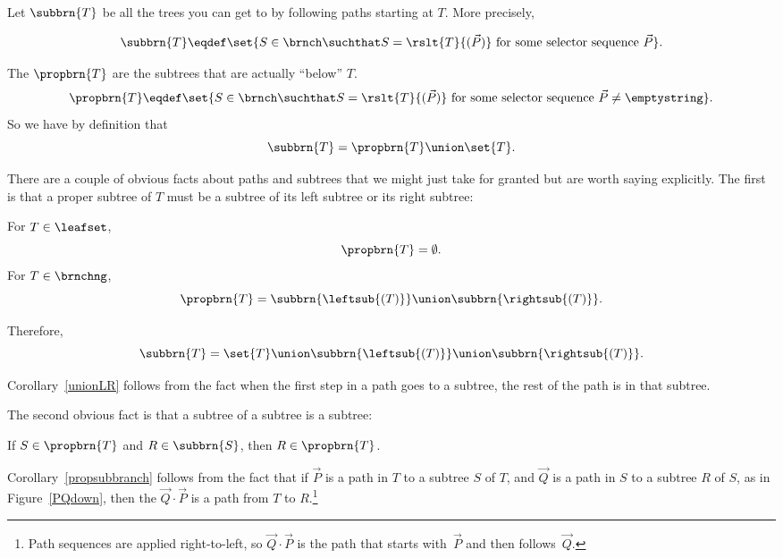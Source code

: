 \begin{definition}
\begin{definition}
\end{definition}
\medskip

Let $\subbrn{T}$ be all the trees you can get to by following paths
starting at $T$.  More precisely,
\begin{definition}\label{def:subtree}
\[
\subbrn{T} \eqdef \set{S \in \brnch \suchthat S =
  \rslt{T}{(\vec{P})}\ \text{for some selector sequence}\ \vec{P}}.
\]
\end{definition}

The  $\propbrn{T}$ are the subtrees that are
actually ``below'' $T$.
\[
\propbrn{T} \eqdef \set{S \in \brnch \suchthat S =
  \rslt{T}{(\vec{P})}\ \text{for some selector
    sequence}\ \vec{P}\neq \emptystring}.
\]
So we have by definition that
\begin{equation}\label{subtree-proptree}
\subbrn{T} = \propbrn{T} \union \set{T}.
\end{equation}

There are a couple of obvious facts about paths and subtrees that we
might just take for granted but are worth saying explicitly.
The first is that a proper subtree of $T$ must be a subtree of its
left subtree or its right subtree:

\begin{corollary}\label{unionLR}
For $T \in \leafset$,
\[
\propbrn{T} =  \emptyset.
\]
For $T \in \brnchng$,
\[
\propbrn{T} = \subbrn{\leftsub{(T)}} \union \subbrn{\rightsub{(T)}}.
\]

Therefore,
\begin{equation}\label{unionTLR}
\subbrn{T} = \set{T} \union \subbrn{\leftsub{(T)}} \union \subbrn{\rightsub{(T)}}.
\end{equation}
\end{corollary}

Corollary~\ref{unionLR} follows from the fact when the first step in a
path goes to a subtree, the rest of the path is in that subtree.

The second obvious fact is that a subtree of a subtree is a subtree:

\begin{corollary}\label{propsubbranch}
If  $S \in \propbrn{T}$ and $R \in \subbrn{S}$, then $R \in \propbrn{T}$.
\end{corollary}

Corollary~\ref{propsubbranch} follows from the fact that if $\vec{P}$
is a path in $T$ to a subtree $S$ of $T$, and $\vec{Q}$ is a path in
$S$ to a subtree $R$ of $S$, as in Figure~\ref{PQdown}, then the
 $\vec{Q} \cdot \vec{P}$ is a path from $T$ to
$R$.\footnote{Path sequences are applied right-to-left, so $\vec{Q}
  \cdot \vec{P}$ is the path that starts with~$\vec{P}$ and then
  follows~$\vec{Q}$.}


\end{definition}
